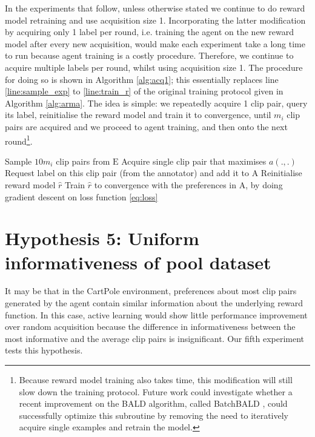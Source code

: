 \documentclass[11pt, a4paper, bibliography=totoc]{report}
\newcommand{\rp}{\hat{r}}
\newcommand{\expbuff}{\mathrm{E}}
\newcommand{\annbuff}{\mathrm{A}}
\begin{document}
In the experiments that follow, unless otherwise stated we continue to do reward model retraining and use acquisition size 1. Incorporating the latter modification by acquiring only 1 label per round, i.e. training the agent on the new reward model after every new acquisition, would make each experiment take a long time to run because agent training is a costly procedure. Therefore, we continue to acquire multiple labels per round, whilst using acquisition size 1. The procedure for doing so is shown in Algorithm \ref{alg:acq1}; this essentially replaces line \ref{line:sample_exp} to \ref{line:train_r} of the original training protocol given in Algorithm \ref{alg:arma}. The idea is simple: we repeatedly acquire 1 clip pair, query its label, reinitialise the reward model and train it to convergence, until $ m_i $ clip pairs are acquired and we proceed to agent training, and then onto the next round\footnote{Because reward model training also takes time, this modification will still slow down the training protocol. Future work could investigate whether a recent improvement on the BALD algorithm, called BatchBALD \cite{Kirsch2019a}, could successfully optimize this subroutine by removing the need to iteratively acquire single examples and retrain the model.}.
\begin{algorithm}
	\caption{Acquiring a batch of clip pairs with acquisition size 1.}
	\label{alg:acq1}
	\begin{algorithmic}[1]
		\State Sample $ 10m_i $ clip pairs from $ \expbuff $ \label{line:sample_exp2}
		\Repeat
		\State Acquire single clip pair that maximises $ a(.,.) $ \label{line:acq2}
		\State Request label on this clip pair (from the annotator) and add it to $ \annbuff $
		\State Reinitialise reward model $ \rp $
		\State Train $ \rp $ to convergence with the preferences in $ \annbuff $, by doing gradient descent on loss function \ref{eq:loss}
	\end{algorithmic}
\end{algorithm}

\section{Hypothesis 5: Uniform informativeness of pool dataset}
It may be that in the CartPole environment, preferences about most clip pairs generated by the agent contain similar information about the underlying reward function. In this case, active learning would show little performance improvement over random acquisition because the difference in informativeness between the most informative and the average clip pairs is insignificant. Our fifth experiment tests this hypothesis.
\end{document}
